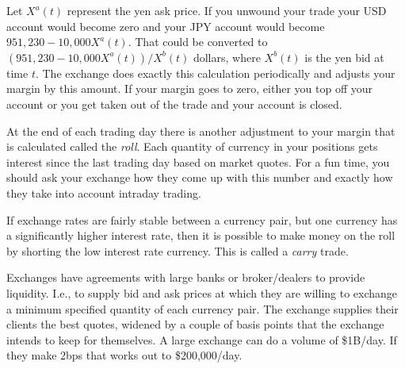 Let $X^a(t)$ represent the yen ask price. If you unwound your trade your
USD account would become zero and your JPY account would become $951,230
- 10,000 X^a(t)$.  That could be converted to $(951,230 - 10,000
X^a(t))/X^b(t)$ dollars, where $X^b(t)$ is the yen bid at time $t$.
The exchange does exactly this calculation periodically and adjusts
your margin by this amount. If your margin goes to zero, either
you top off your account or you get taken out of the trade and your
account is closed.

At the end of each trading day there is another adjustment to your margin
that is calculated called the {\em roll}. Each quantity of currency in
your positions gets interest since the last trading day based on market
quotes. For a fun time, you should ask your exchange how they come up
with this number and exactly how they take into account intraday
trading.

If exchange rates are fairly stable between a currency pair, but one
currency has a significantly higher interest rate, then it is possible
to make money on the roll by shorting the low interest rate currency.
This is called a {\em carry} trade.

Exchanges have agreements with large banks or broker/dealers to provide
liquidity. I.e., to supply bid and ask prices at which they are willing
to exchange a minimum specified quantity of each currency pair. The
exchange supplies their clients the best quotes, widened by a couple of
basis points that the exchange intends to keep for themselves. A large
exchange can do a volume of \$1B/day. If they make 2bps that works out
to \$200,000/day.

